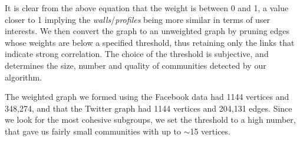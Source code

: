 It is clear from the above equation that the weight is between 0 and 1, a value closer to 1 implying the {\it walls}/{\it profiles} being more similar in terms of user interests.
We then convert the graph to an unweighted graph by pruning edges whose weights are below a specified threshold, thus retaining only the links that indicate strong correlation. The choice of the threshold is subjective, and determines the size, number and quality of communities detected by our algorithm. 

The weighted graph we formed using the Facebook data had 1144 vertices and 348,274, and that the Twitter graph had 1144 vertices and 204,131 edges. Since we look for the most cohesive subgroups, we set the threshold to a high number, that gave us fairly small communities with up to $\sim$15 vertices.





